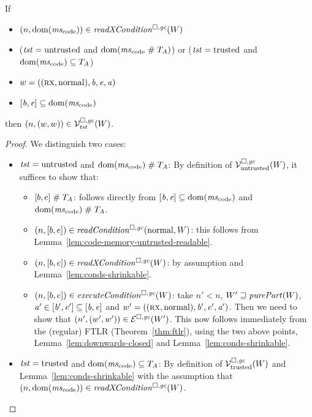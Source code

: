\documentclass[a4paper]{article}
\begin{document}
\begin{lemma}
  \label{lem:ftlr-component-code-ptrs}
  If
  \begin{itemize}
  \item $\npair{\dom(\mscode)}\in\xReadCond{W}$
  \item ($\trust = \untrusted$ and $\dom(\mscode \mathrel{\#} \ta)$) or ($\trust = \trusted$ and $\dom(\mscode) \subseteq \ta$)
  \item $w = ((\rx,\normal),\baddr,\eaddr,\aaddr)$
  \item $[\baddr,\eaddr]\subseteq \dom(\mscode)$
  \end{itemize}

  then $\npair{(w,w)} \in \lrvg{\trust}(W)$.
\end{lemma}
\begin{proof}
  We distinguish two cases:
  \begin{itemize}
  \item $\trust = \untrusted$ and $\dom(\mscode) \mathrel{\#} \ta$:
    By definition of $\lrv(W)$, it suffices to show that:
    \begin{itemize}
    \item $[b,e] \mathrel{\#} \ta$: follows directly from $[\baddr,\eaddr]\subseteq \dom(\mscode)$ and $\dom(\mscode) \mathrel{\#} \ta$.
    \item $\npair{[b,e]}\in\readCond{\normal,W}$:
      this follows from Lemma~\ref{lem:code-memory-untrusted-readable}.
    \item $\npair{[b,e]}\in\xReadCond{W}$:
      by assumption and Lemma~\ref{lem:conds-shrinkable}.
    \item $\npair{[b,e]}\in\execCond{W}$:
      take $n' < n$, $W' \future \purePart{W}$, $\aaddr' \in [\baddr',\eaddr'] \subseteq [\baddr,\eaddr]$ and $w' = ((\rx,\normal),\baddr',\eaddr',\aaddr')$.
      Then we need to show that $\npair[n']{(w',w')} \in \lre(W')$.
      This now follows immediately from the (regular) FTLR (Theorem~\ref{thm:ftlr}), using the two above points, Lemma~\ref{lem:downwards-closed} and Lemma~\ref{lem:conds-shrinkable}.
    \end{itemize}

  \item $\trust = \trusted$ and $\dom(\mscode) \subseteq \ta$:
    By definition of $\lrvg{\trusted}(W)$ and Lemma~\ref{lem:conds-shrinkable} with the assumption that $\npair{\dom(\mscode)}\in\xReadCond{W}$.
  \end{itemize}
\end{proof}
\end{document}
